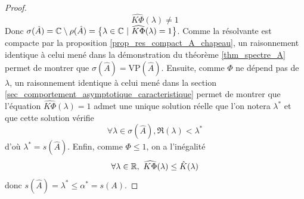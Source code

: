 \begin{proof}
    \begin{equation*}
        \widehat{K\Phi}(\lambda) \neq 1
    \end{equation*}
    Donc $\sigma(\hat{A}) = \bbC \setminus \rho(\hat{A}) = \big\{\lambda \in \bbC \ | \ \widehat{K\Phi}(\lambda)=1\big\}$. Comme la résolvante est compacte par la proposition \ref{prop_res_compact_A_chapeau}, un raisonnement identique à celui mené dans la démonstration du théorème \ref{thm_spectre_A} permet de montrer que $\sigma(\hat{A})=\mathrm{VP}(\hat{A})$. Ensuite, comme $\Phi$ ne dépend pas de $\lambda$, un raisonnement identique à celui mené dans la section \ref{sec_comportement_asymptotique_caracteristique} permet de montrer que l'équation $\widehat{K\Phi}(\lambda)=1$ admet une unique solution réelle que l'on notera $\lambda^*$ et que cette solution vérifie 
    \begin{equation*}
        \forall \lambda \in \sigma(\hat{A}), \Re(\lambda) < \lambda^*
    \end{equation*}
    d'où $\lambda^*=s(\hat{A})$. Enfin, comme $\Phi \leq 1$, on a l'inégalité 
    \begin{equation*}
        \forall \lambda \in \mathbb{R}, \ \widehat{K\Phi}(\lambda) \leq \hat{K}(\lambda)
    \end{equation*}
    donc $s(\hat{A}) = \lambda^* \leq \alpha^* = s(A)$.
\end{proof}

